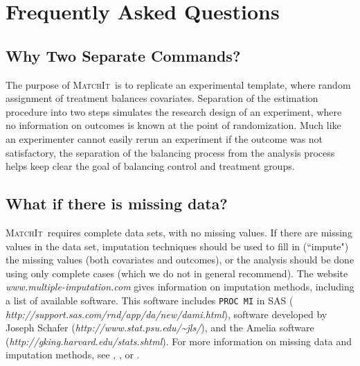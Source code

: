 \documentclass[oneside,letterpaper,titlepage]{article}
\newcommand{\MatchIt}{\textsc{MatchIt}}
\begin{document}
\section{Frequently Asked Questions}

\subsection{Why Two Separate Commands?}
The purpose of \MatchIt\ is to replicate an experimental template,
where random assignment of treatment balances covariates.  Separation
of the estimation procedure into two steps simulates the research
design of an experiment, where no information on outcomes is known at
the point of randomization.  Much like an experimenter cannot easily
rerun an experiment if the outcome was not satisfactory, the
separation of the balancing process from the analysis process helps
keep clear the goal of balancing control and treatment groups.

\subsection{What if there is missing data?}
\MatchIt\ requires complete data sets, with no missing values.  If
there are missing values in the data set, imputation techniques should
be used to fill in (``impute") the missing values (both covariates and
outcomes), or the analysis should be done using only complete cases
(which we do not in general recommend).  The website {\em
  www.multiple-imputation.com} gives information on imputation
methods, including a list of available software.  This software
includes \texttt{PROC MI} in SAS ({\em
  http://support.sas.com/rnd/app/da/new/dami.html}), software
developed by Joseph Schafer ({\em http://www.stat.psu.edu/\~{}jls/}),
and the Amelia software ({\em http://gking.harvard.edu/stats.shtml}).
For more information on missing data and imputation methods, see
\cite{KinHonJos01}, \cite{LitRub02}, or \cite{Schafer97}.
\end{document}
